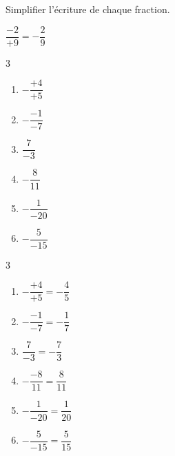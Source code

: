 \begin{exercice*}
    Simplifier l'écriture de chaque fraction.

    \begin{exemple*1}
      $ \dfrac{-2}{+9} = - \dfrac29 $
    \end{exemple*1}

    \begin{multicols}3
      \begin{spacing}{2}
        \begin{enumerate}
          \item $-\dfrac{+4}{+5}$
          \item $-\dfrac{-1}{-7}$
          \item $\dfrac{7}{-3}$
          \item $-\dfrac{8}{11}$
          \item $-\dfrac{1}{-20}$
          \item $-\dfrac{5}{-15}$
        \end{enumerate}              
      \end{spacing}
    \end{multicols}
\end{exercice*}
\begin{corrige}
    \phantom{rrr}
    \begin{multicols}3
      \begin{spacing}{2}
        \begin{enumerate}
          \item $-\dfrac{+4}{+5} = -\dfrac{4}{5}$
          \item $-\dfrac{-1}{-7} = -\dfrac{1}{7}$
          \item $ \dfrac{7}{-3}  = -\dfrac{7}{3} $
          \item $-\dfrac{-8}{11}  = \dfrac{8}{11} $
          \item $-\dfrac{1}{-20} = \dfrac{1}{20}$
          \item $-\dfrac{5}{-15} = \dfrac{5}{15}$
        \end{enumerate}
      \end{spacing}
    \end{multicols}
\end{corrige}

